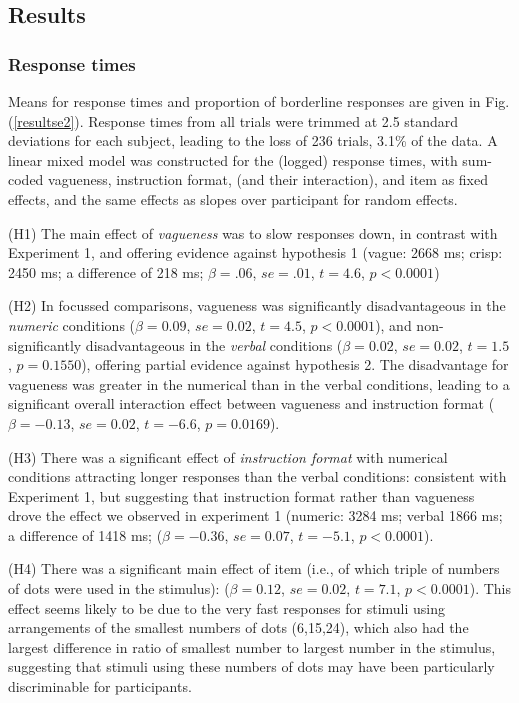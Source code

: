 \documentclass[%
man,		%
floatsintext,%
apacite%
]{apa6}
\begin{document}
\subsection{Results} %

\subsubsection{Response times} %
Means for response times and proportion of borderline responses are given in Fig. (\ref{resultse2}). 
Response times from all trials were trimmed at 2.5 standard deviations for each subject, leading to the loss of 236 trials, 3.1\% of the data. 
A linear mixed model was constructed for the (logged) response times, 
with sum-coded vagueness, instruction format, (and their interaction), and item as fixed effects, and the same effects as slopes over participant for random effects.
\begin{APAenumerate}
	\item [(H1)] The main effect of \emph{vagueness} was to slow responses down, in contrast with Experiment 1, and offering evidence against hypothesis 1 (vague: 2668 ms; crisp: 2450 ms; a difference of 218 ms; $\beta=.06$, $se=.01$, $t=4.6$, $p<0.0001$) 
	\item [(H2)] In focussed comparisons, vagueness was significantly disadvantageous in the \emph{numeric} conditions ($\beta=0.09$, $se=0.02$, $t=4.5$, $p<0.0001$), and non-significantly disadvantageous in the \emph{verbal} conditions ($\beta=0.02$, $se=0.02$, $t=1.5$, $p=0.1550$), offering partial evidence against hypothesis 2. The disadvantage for vagueness was greater in the numerical than in the verbal conditions, leading to a significant overall interaction effect between vagueness and instruction format ($\beta=-0.13$, $se=0.02$, $t=-6.6$, $p=0.0169$).
	\item [(H3)] There was a significant effect of \emph{instruction format} with numerical conditions attracting longer responses than the verbal conditions: consistent with Experiment 1, but suggesting that instruction format rather than vagueness drove the effect we observed in experiment 1 (numeric: 3284 ms; verbal 1866 ms; a difference of 1418 ms; ($\beta=-0.36$, $se=0.07$, $t=-5.1$, $p<0.0001$).
	\item [(H4)] There was a significant main effect of item (i.e., of which triple of numbers of dots were used in the stimulus): ($\beta=0.12$, $se=0.02$, $t=7.1$, $p<0.0001$). This effect seems likely to be due to the very fast responses for stimuli using arrangements of the smallest numbers of dots (6,15,24), which also had the largest difference in ratio of smallest number to largest number in the stimulus, suggesting that stimuli using these numbers of dots may have been particularly discriminable for participants.
\end{APAenumerate}
\end{document}
